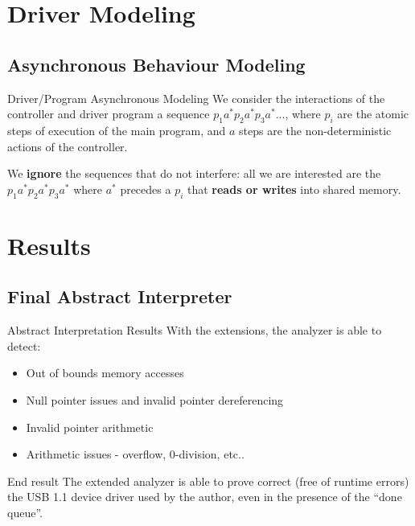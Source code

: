 \documentclass[aspectratio=169]{beamer}
\begin{document}
\section{Driver Modeling}

\subsection{Asynchronous Behaviour Modeling}
\begin{frame}{Driver/Program Asynchronous Modeling}
  We consider the interactions of the controller and driver program a sequence $p_1a^*p_2a^*p_3a^*...$, where $p_i$ are the atomic steps of execution of the main program,
  and $a$ steps are the non-deterministic actions of the controller.

  We \textbf{ignore} the sequences that do not interfere: all we are interested are the $p_1a^*p_2a^*p_3a^*$ where $a^*$ precedes a $p_i$ that \textbf{reads or writes} into
  shared memory.
\end{frame}

\section{Results}

\subsection{Final Abstract Interpreter}
\begin{frame}{Abstract Interpretation Results}
  With the extensions, the analyzer is able to detect:
  \begin{itemize}
  \item Out of bounds memory accesses
  \item Null pointer issues and invalid pointer dereferencing
  \item Invalid pointer arithmetic
  \item Arithmetic issues - overflow, 0-division, etc..
  \end{itemize}
  \begin{exampleblock}{End result}
    The extended analyzer is able to prove correct (free of runtime errors) the USB 1.1 device driver used by the author, even in the presence of the ``done queue''.
  \end{exampleblock}
\end{frame}
\end{document}
